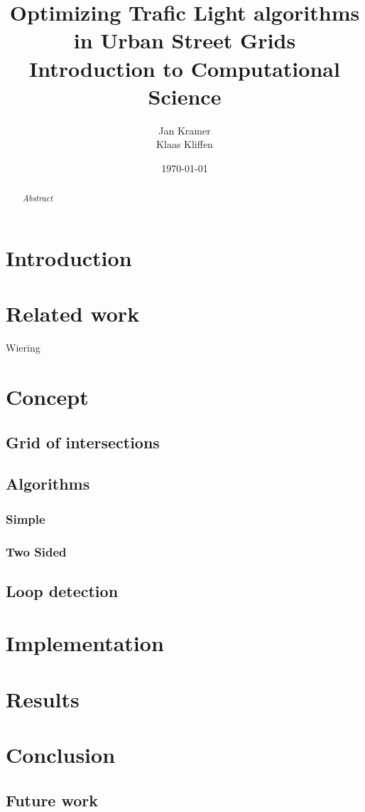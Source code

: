 \documentclass[a4paper,11pt]{article}
\title{Optimizing Trafic Light algorithms in Urban Street Grids\\
\large Introduction to Computational Science}
\author{Jan Kramer\\Klaas Kliffen}
\date{\today}
\begin{document}
\begin{titlepage}
\maketitle
\thispagestyle{empty}
\begin{abstract}
\textit{
 Abstract
}
\end{abstract}
\end{titlepage}

\newpage
\tableofcontents

\newpage

\section{Introduction}


\section{Related work}

Wiering \cite{Wiering00}

\section{Concept}

\subsection{Grid of intersections}

\subsection{Algorithms}

\subsubsection*{Simple}

\subsubsection*{Two Sided}

\subsection*{Loop detection}

\section{Implementation}

\section{Results}

\section{Conclusion}


\subsection{Future work}




\end{document}

